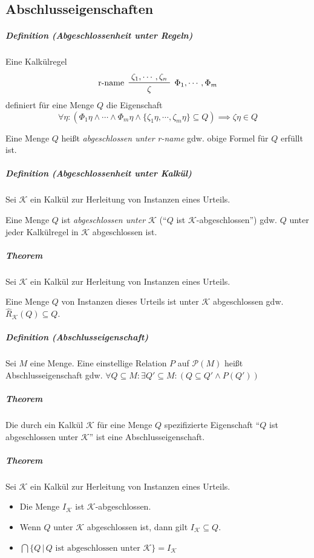 \documentclass[a4paper, 11pt, accentcolor = tud3b]{tudreport}
\newcommand{\forwhich}{\ensuremath{{\,\vert\,}}}
\newcommand{\definition}[2]{\subparagraph{Definition (#1)} #2}
\newcommand{\theorem}[1]{\subparagraph{Theorem} #1}
\begin{document}
		    \subsection{Abschlusseigenschaften}
			    \definition{Abgeschlossenheit unter Regeln}{
				    Eine Kalkülregel
				    \begin{equation*}
					    \prftree[l, r]
						    { $ \Phi _ 1, \cdots, \Phi _ m $ }
						    { r-name }
						    { \zeta _ 1, \cdots, \zeta _ n }
						    { \zeta }
				    \end{equation*}
				    definiert für eine Menge $ Q $ die Eigenschaft
				    \begin{equation*}
					    \forall \eta : (\Phi _ 1 \eta \land \cdots \land \Phi _ m \eta \land \{ \zeta _ 1 \eta, \cdots, \zeta _ m \eta \} \subseteq Q) \implies \zeta\eta \in Q
				    \end{equation*}
				    
				    Eine Menge $ Q $ heißt \textit{abgeschlossen unter r-name} gdw. obige Formel für $ Q $ erfüllt ist.
			    }
			    
			    \definition{Abgeschlossenheit unter Kalkül}{
			    	Sei $ \mathcal{K} $ ein Kalkül zur Herleitung von Instanzen eines Urteils.
			    	
			    	Eine Menge $ Q $ ist \textit{abgeschlossen unter $ \mathcal{K} $} (\enquote{$ Q $ ist $ \mathcal{K} $-abgeschlossen}) gdw. $ Q $ unter jeder Kalkülregel in $ \mathcal{K} $ abgeschlossen ist.
			    }
			    
			    \theorem{
				    Sei $ \mathcal{K} $ ein Kalkül zur Herleitung von Instanzen eines Urteils.
				    
				    Eine Menge $ Q $ von Instanzen dieses Urteils ist unter $ \mathcal{K} $ abgeschlossen gdw. $ \hat{R} _ \mathcal{K} (Q) \subseteq Q $.
			    }
			    
			    \definition{Abschlusseigenschaft}{Sei $ M $ eine Menge. Eine einstellige Relation $ P $ auf $ \mathcal{P}(M) $ heißt Abschlusseigenschaft gdw. $ \forall Q \subseteq M : \exists Q' \subseteq M : (Q \subseteq Q' \land P(Q')) $}
			    
			    \theorem{
				    Die durch ein Kalkül $ \mathcal{K} $ für eine Menge $ Q $ spezifizierte Eigenschaft \enquote{$ Q $ ist abgeschlossen unter $ \mathcal{K} $} ist eine Abschlusseigenschaft.
				}
		    
			    \theorem{
				    Sei $ \mathcal{K} $ ein Kalkül zur Herleitung von Instanzen eines Urteils.
				    \begin{itemize}
				    	\item Die Menge $ I _ \mathcal{K} $ ist $ \mathcal{K} $-abgeschlossen.
				    	\item Wenn $ Q $ unter $ \mathcal{K} $ abgeschlossen ist, dann gilt $ I _ \mathcal{K} \subseteq Q $.
				    	\item $ \bigcap \{ Q \forwhich Q \text{ ist abgeschlossen unter } \mathcal{K} \} = I _ \mathcal{K} $
				    \end{itemize}
			    }
    
\end{document}
